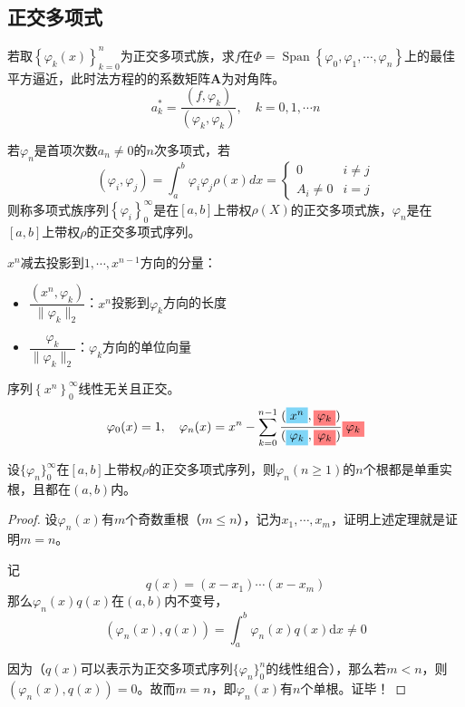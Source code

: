 \subsection{正交多项式}
若取$\left\{ \varphi_k(x) \right\}_{k = 0}^{n}$为正交多项式族，求$f$在$\Phi = \operatorname{Span}\left\{ \varphi_0,\varphi_1,\cdots,\varphi_n \right\}$上的最佳平方逼近，此时\colorbox{red!50}{法方程}的的系数矩阵\colorbox{red!50}{$\boldsymbol{A}$}为\colorbox{cyan!50}{对角阵}。
\[
    a_k^*=\frac{(f,\varphi_k)}{(\varphi_k,\varphi_k)},\quad k=0,1,\cdots n
\]
\begin{definition}[正交多项式族]
    若$\varphi_n$是首项次数$a_n\neq 0$的$n$次多项式，若
    \[
        (\varphi_i,\varphi_j)=\int_a^b\varphi_i\varphi_j\rho(x)dx = \left\{
            \begin{array}{lr}
                0 & i\neq j \\
                A_{i}\neq 0 & i = j
            \end{array}
        \right.
    \]
    则称多项式族序列$\left\{ \varphi_i \right\}_{0}^{\infty}$是在$[a,b]$上带权$\rho(X)$的正交多项式族，$\varphi_n$是在$[a,b]$上带权$\rho$的正交多项式序列。
\end{definition}
\begin{definition}[施密特正交化]
    $x^n$减去投影到$1,\cdots,x^{n-1}$方向的分量：
    \begin{itemize}
        \item $\dfrac{(x^n,\varphi_k)}{\| \varphi_k \|_2}$：$x^n$投影到$\varphi_k$方向的长度
        \item $\dfrac{\varphi_k}{\| \varphi_k \|_2}$：$\varphi_k$方向的单位向量
    \end{itemize}
    序列$\left\{ x^n \right\}_{0}^{\infty}$\colorbox{cyan!50}{线性无关且正交}。
    \[
        \varphi_0(x)=1,\quad\varphi_n(x)=x^n-\sum_{k=0}^{n-1}\frac{(\colorbox{cyan!50}{$x^n$},\colorbox{red!50}{$\varphi_k$})}{(\colorbox{cyan!50}{$\varphi_k$},\colorbox{red!50}{$\varphi_k$})}\colorbox{red!50}{$\varphi_k$}
    \]
\end{definition}
\begin{theorem}
    设$\{\varphi_{n}\}_{0}^{\infty}$在$[a,b]$上带权$\rho$的正交多项式序列，则$\varphi_n(n\geqslant 1)$的$n$个根都是单重实根，且都在$(a,b)$内。
\end{theorem}
\begin{proof}
    设$\varphi_{n}(x)$有$m$个奇数重根（$m\leqslant n$），记为$x_1,\cdots,x_m$，证明上述定理就是证明$m = n$。

    记
    \[
        q(x) = (x-x_1)\cdots(x-x_m)
    \]
    那么$\varphi_{n}(x) q(x)$在$(a,b)$内不变号，
    \[
        (\varphi_{n}(x), q(x)) = \int_{a}^{b}\varphi_{n}(x) q(x)\mathrm{d}x\neq 0
    \]
    
    \colorbox{cyan!50}{因为（$q(x)$可以表示为正交多项式序列$\{\varphi_{n}\}_{0}^{n}$的线性组合）}，那么若$m<n$，则$(\varphi_{n}(x), q(x)) = 0$。故而$m = n$，即$\varphi_{n}(x)$有$n$个单根。证毕！
\end{proof}

